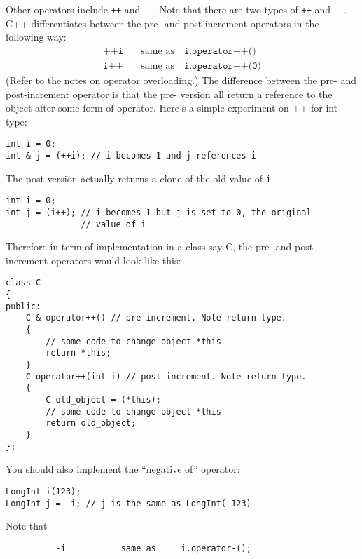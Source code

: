 Other operators include \verb!++! and \verb!--!. Note that there are 
two types of \verb!++! and \verb!--!. C++ differentiates between the 
pre- and post-increment operators in the following way:
\begin{align*}
\texttt{++i} \,\,\,\, &\text{ same as } \,\,\,\,   \texttt{i.operator++()} \\
\texttt{i++} \,\,\,\, &\text{ same as } \,\,\,\,   \texttt{i.operator++(0)}
\end{align*}
(Refer to the notes on operator overloading.) The difference between 
the pre- and post-increment operator is that the pre- version all 
return a reference to the object after some form of operator. Here's 
a simple experiment on ++ for int type:

\begin{Verbatim}[fontsize=\footnotesize,frame=single]
int i = 0;
int & j = (++i); // i becomes 1 and j references i
\end{Verbatim}

The post version actually returns a clone of the old value of \verb!i!

\begin{Verbatim}[fontsize=\footnotesize,frame=single]
int i = 0;
int j = (i++); // i becomes 1 but j is set to 0, the original 
               // value of i
\end{Verbatim}

Therefore in term of implementation in a class say C, the pre- 
and post-increment operators would look like this:

\begin{Verbatim}[fontsize=\footnotesize,frame=single]
class C
{
public:
    C & operator++() // pre-increment. Note return type.
    {
        // some code to change object *this
        return *this;
    }
    C operator++(int i) // post-increment. Note return type.
    {
        C old_object = (*this);
        // some code to change object *this
        return old_object;
    }
};
\end{Verbatim}

You should also implement the “negative of” operator:

\begin{Verbatim}[fontsize=\footnotesize,frame=single]
LongInt i(123);
LongInt j = -i; // j is the same as LongInt(-123)
\end{Verbatim}

Note that

\verb!          -i           same as     i.operator-();! 

